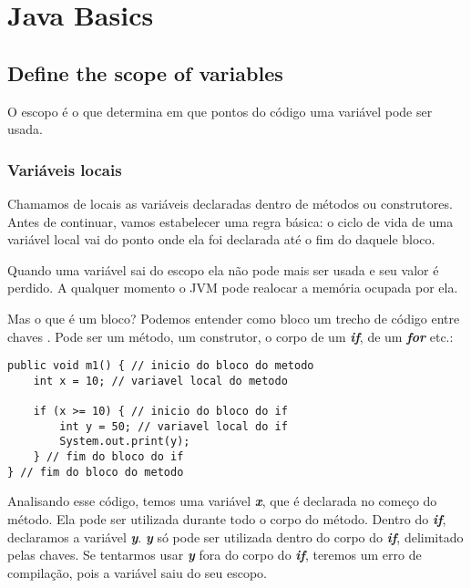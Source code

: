 \documentclass[12pt]{article}
\begin{document}
\newpage

\setcounter{page}{1} %
\tableofcontents %
\pagestyle{fancy}
\fancyfoot[C]{\thepage} %
\newpage

\setcounter{page}{1} %
\pagestyle{fancy}
\fancyfoot[C]{\thepage}


\section{Java Basics}
\subsection{Define the scope of variables}

O escopo é o que determina em que pontos do código uma variável pode ser usada.

\subsubsection{Variáveis locais}

Chamamos de locais as variáveis declaradas dentro de métodos ou construtores. Antes de continuar, vamos estabelecer uma regra básica: o ciclo de vida de uma variável local vai do ponto onde ela foi declarada até o fim do daquele bloco.

Quando uma variável sai do escopo ela não pode mais ser usada e seu valor é perdido. A qualquer momento o JVM pode realocar a memória ocupada por ela.

Mas o que é um bloco? Podemos entender como bloco um trecho de código entre chaves \textbf{\textit{{}}}. Pode ser um método, um construtor, o corpo de um \textbf{\textit{if}}, de um \textbf{\textit{for}} etc.:

\begin{lstlisting}
public void m1() { // inicio do bloco do metodo
	int x = 10; // variavel local do metodo
	
	if (x >= 10) { // inicio do bloco do if
		int y = 50; // variavel local do if
		System.out.print(y);
	} // fim do bloco do if
} // fim do bloco do metodo
\end{lstlisting}

Analisando esse código, temos uma variável \textbf{\textit{x}}, que é declarada no começo do método. Ela pode ser utilizada durante todo o corpo do método. Dentro do \textbf{\textit{if}}, declaramos a variável \textbf{\textit{y}}. \textbf{\textit{y}} só pode ser utilizada dentro do corpo do \textbf{\textit{if}}, delimitado pelas chaves. Se tentarmos usar \textbf{\textit{y}} fora do corpo do \textbf{\textit{if}}, teremos um erro de compilação, pois a variável saiu do seu escopo.
\end{document}
